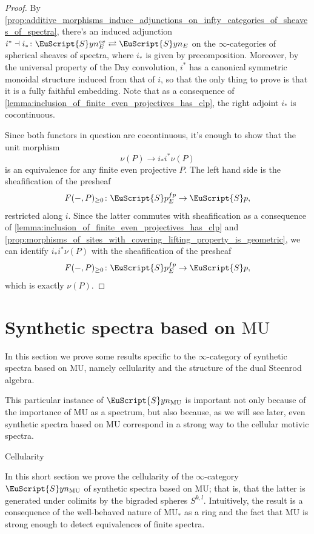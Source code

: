 \documentclass[oneside,a4paper]{amsart}
\makeatletter
\newcommand{\euscr}[1]{\EuScript{#1}} %
\newcommand{\MU}{\mathrm{MU}} %
\newcommand{\spectra}{\euscr{S}p} %
\newcommand{\synspectra}{\euscr{S}yn} %
\theoremstyle{plain}
\theoremstyle{definition}
\theoremstyle{remark}
\def\subsection{\@startsection{subsection}{1}%
  \z@{.7\linespacing\@plus\linespacing}{.5\linespacing}%
  {\normalfont\bfseries\centering}}%
\makeatother
\begin{document}
\begin{proof}
By \cref{prop:additive_morphisms_induce_adjunctions_on_infty_categories_of_sheaves_of_spectra}, there's an induced adjunction $i^{*} \dashv i_{*} \colon \synspectra_{E}^{ev} \rightleftarrows \synspectra_{E}$ on the $\infty$-categories of spherical sheaves of spectra, where $i_{*}$ is given by precomposition. Moreover, by the universal property of the Day convolution, $i^{*}$ has a canonical symmetric monoidal structure induced from that of $i$, so that the only thing to prove is that it is a fully faithful embedding. Note that as a consequence of \cref{lemma:inclusion_of_finite_even_projectives_has_clp}, the right adjoint $i_{*}$ is cocontinuous. 

Since both functors in question are cocontinuous, it's enough to show that the unit morphism
\[
\nu(P) \rightarrow i_{*} i^{*} \nu(P)
\]
is an equivalence for any finite even projective $P$. The left hand side is the sheafification of the presheaf 
\[
F(-, P)_{\geq 0} \colon \spectra_{E}^{fp} \rightarrow \spectra,
\]
restricted along $i$. Since the latter commutes with sheafification as a consequence of \cref{lemma:inclusion_of_finite_even_projectives_has_clp} and \cref{prop:morphisms_of_sites_with_covering_lifting_property_is_geometric}, we can identify $i_{*} i^{*} \nu(P)$ with the sheafification of the presheaf 
\[
F(-, P)_{\geq 0} \colon \spectra_{E}^{fp} \rightarrow \spectra,
\]
which is exactly $\nu(P)$.
\end{proof}
 
\section{Synthetic spectra based on $\MU$}
\label{section:synthetic_spectra_based_on_mu}

In this section we prove some results specific to the $\infty$-category of synthetic spectra based on $\MU$, namely cellularity and the structure of the dual Steenrod algebra. 

This particular instance of $\synspectra_{\MU}$ is important not only because of the importance of $\MU$ as a spectrum, but also because, as we will see later, even synthetic spectra based on $\MU$ correspond in a strong way to the cellular motivic spectra.

\subsection{Cellularity} 

In this short section we prove the cellularity of the $\infty$-category $\synspectra_{\MU}$ of synthetic spectra based on $\MU$; that is, that the latter is generated under colimits by the bigraded spheres $S^{k, l}$. Intuitively, the result is a consequence of the well-behaved nature of $\MU_{*}$ as a ring and the fact that $\MU$ is strong enough to detect equivalences of finite spectra. 
\end{document}
